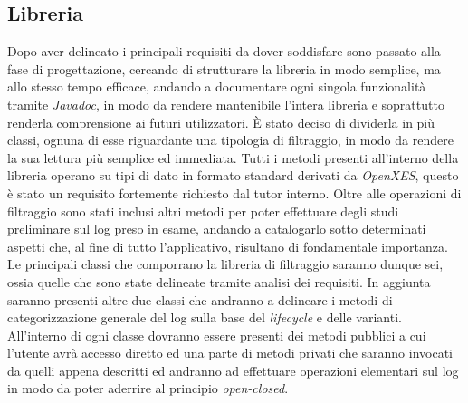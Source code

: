 \subsection{Libreria}
Dopo aver delineato i principali requisiti da dover soddisfare sono passato alla fase di progettazione, cercando di strutturare la libreria in modo semplice, ma allo stesso tempo efficace, andando a documentare ogni singola funzionalità tramite \textit{\gls{Javadoc}}, in modo da rendere mantenibile l'intera libreria e soprattutto renderla comprensione ai futuri utilizzatori. È stato deciso di dividerla in più classi, ognuna di esse riguardante una tipologia di filtraggio, in modo da rendere la sua lettura più semplice ed immediata. Tutti i metodi presenti all'interno della libreria operano su tipi di dato in formato standard derivati da \textit{OpenXES}, questo è stato un requisito fortemente richiesto dal tutor interno. Oltre alle operazioni di filtraggio sono stati inclusi altri metodi per poter effettuare degli studi preliminare sul log preso in esame, andando a catalogarlo sotto determinati aspetti che, al fine di tutto l'applicativo, risultano di fondamentale importanza. Le principali classi che comporrano la libreria di filtraggio saranno dunque sei, ossia quelle che sono state delineate tramite analisi dei requisiti.
In aggiunta saranno presenti altre due classi che andranno a delineare i metodi di categorizzazione generale del log sulla base del \textit{lifecycle} e delle varianti. All'interno di ogni classe dovranno essere presenti dei metodi pubblici a cui l'utente avrà accesso diretto ed una parte di metodi privati che saranno invocati da quelli appena descritti ed andranno ad effettuare operazioni elementari sul log in modo da poter aderrire al principio \textit{\gls{open-closed}}.
